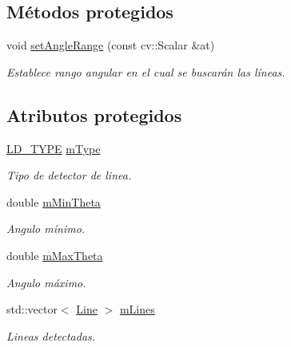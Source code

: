 \subsection*{Métodos protegidos}
\begin{DoxyCompactItemize}
\item 
void \hyperlink{class_i3_d_1_1_line_detector_a3021a94cd1cb6d53f855844eab5188a9}{set\+Angle\+Range} (const cv\+::\+Scalar \&at)
\begin{DoxyCompactList}\small\item\em Establece rango angular en el cual se buscarán las líneas. \end{DoxyCompactList}\end{DoxyCompactItemize}
\subsection*{Atributos protegidos}
\begin{DoxyCompactItemize}
\item 
\hyperlink{namespace_i3_d_ac3913218d62e4e56ed38931636256ae2}{L\+D\+\_\+\+T\+Y\+PE} \hyperlink{class_i3_d_1_1_line_detector_ae988a8bc160374b7314ccff2495deced}{m\+Type}
\begin{DoxyCompactList}\small\item\em Tipo de detector de linea. \end{DoxyCompactList}\item 
double \hyperlink{class_i3_d_1_1_line_detector_a3d359c9077a01c74308c4c05975a17d5}{m\+Min\+Theta}
\begin{DoxyCompactList}\small\item\em Angulo mínimo. \end{DoxyCompactList}\item 
double \hyperlink{class_i3_d_1_1_line_detector_afbb629bc06fdc61296e03b93506e0c37}{m\+Max\+Theta}
\begin{DoxyCompactList}\small\item\em Angulo máximo. \end{DoxyCompactList}\item 
std\+::vector$<$ \hyperlink{group___geometric_entities_ga483b43891a1b33d99406fdc397e9a445}{Line} $>$ \hyperlink{class_i3_d_1_1_line_detector_aa5a297aa79f93e96dcb4574bc051f3d4}{m\+Lines}
\begin{DoxyCompactList}\small\item\em Lineas detectadas. \end{DoxyCompactList}\end{DoxyCompactItemize}


